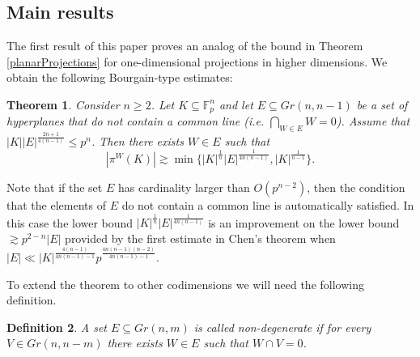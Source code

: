 \documentclass{amsart}
\newtheorem{theorem}{Theorem}[section]
\newtheorem{definition}[theorem]{Definition}
\newcommand{\F}{\mathbb F}
\begin{document}
\subsection{Main results}
The first result of this paper proves an analog of the bound in Theorem \ref{planarProjections} for one-dimensional projections in higher dimensions. We obtain the following Bourgain-type estimates:
\begin{theorem}\label{lineProjections}
    Consider $n \geq 2$. Let $K \subseteq \F_p^n$ and let $E \subseteq Gr(n, n - 1)$ be a set of hyperplanes that do not contain a common line (i.e. $\bigcap_{W \in E} W = 0$). Assume that $|K| |E|^\frac{2n + 1}{4(n - 1)} \leq p^n$. Then there exists $W \in E$ such that $$|\pi^W(K)| \gtrsim \min \{|K|^\frac{1}{n}|E|^\frac{1}{4n(n - 1)}, |K|^\frac{1}{n - 1}\}.$$
\end{theorem}

Note that if the set $E$ has cardinality larger than $O(p^{n - 2})$, then the condition that the elements of $E$ do not contain a common line is automatically satisfied. In this case the lower bound $|K|^\frac{1}{n}|E|^\frac{1}{4n(n - 1)}$ is an improvement on the lower bound $\gtrsim p^{2 - n}|E|$ provided by the first estimate in Chen's theorem when $|E| \ll |K|^\frac{4(n - 1)}{4n(n - 1) - 1} p^\frac{4n(n - 1)(n - 2)}{4n(n - 1) - 1}$.

To extend the theorem to other codimensions we will need the following definition.

\begin{definition}
    A set $E \subseteq Gr(n, m)$ is called non-degenerate if for every $V \in Gr(n, n - m)$ there exists $W \in E$ such that $W \cap V = 0$.
\end{definition}
\end{document}
